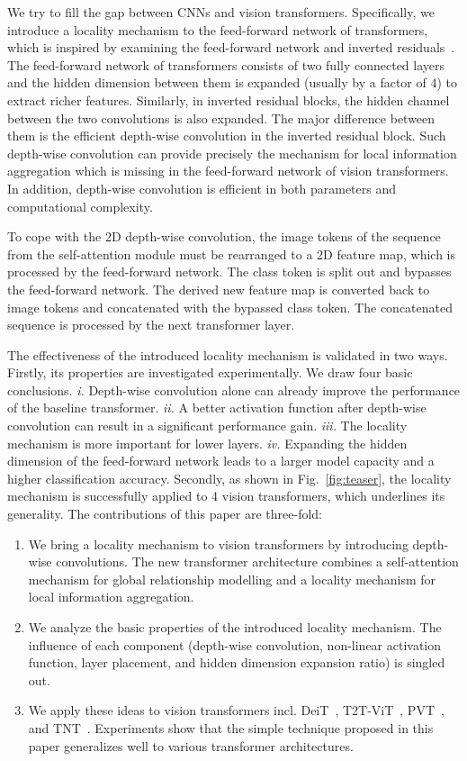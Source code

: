 \documentclass[10pt,twocolumn,letterpaper]{article}
\begin{document}
We try to fill the gap between CNNs and vision transformers. Specifically, we introduce a locality mechanism to the feed-forward network of transformers, which is inspired by examining the feed-forward network and inverted residuals~\cite{sandler2018mobilenetv2,howard2019searching}. The feed-forward network of transformers consists of two fully connected layers and the hidden dimension between them is expanded (usually by a factor of 4) to extract richer features. 
Similarly, in inverted residual blocks, the hidden channel between the two  convolutions is also expanded. The major difference between them is the efficient depth-wise convolution in the inverted residual block. 
Such depth-wise convolution can provide precisely the mechanism for local information aggregation which is missing in the feed-forward network of vision transformers.
In addition, depth-wise convolution is efficient in both parameters and computational complexity. 
 
To cope with the 2D depth-wise convolution, the image tokens of the sequence from the self-attention module must be rearranged to a 2D feature map, which is processed by the feed-forward network. The class token is split out and bypasses the feed-forward network. The derived new feature map is converted back to image tokens and concatenated with the bypassed class token. The concatenated sequence is processed by the next transformer layer. 

The effectiveness of the introduced locality mechanism is validated in two ways. Firstly, its properties are investigated experimentally. We draw four basic conclusions. \textit{i.} Depth-wise convolution alone can already improve the performance of the baseline transformer. \textit{ii.} A better activation function after depth-wise convolution can result in a significant performance gain. \textit{iii.} The locality mechanism is more important for lower layers. \textit{iv.} Expanding the hidden dimension of the feed-forward network leads to a larger model capacity and a higher classification accuracy. Secondly, as shown in Fig.~\ref{fig:teaser}, the locality mechanism is successfully applied to 4 vision transformers, which underlines its generality.  
The contributions of this paper are three-fold:
\begin{enumerate}
    \item We bring a locality mechanism to vision transformers by introducing depth-wise convolutions. The new transformer architecture combines a self-attention mechanism for global relationship modelling and a locality mechanism for local information aggregation.
    \item We analyze the basic properties of the introduced locality mechanism. The influence of each component (depth-wise convolution, non-linear activation function, layer placement, and hidden dimension expansion ratio) is singled out.
    \item We apply these ideas to vision transformers incl. DeiT~\cite{touvron2020training}, T2T-ViT~\cite{yuan2021tokens}, PVT~\cite{wang2021pyramid}, and TNT~\cite{han2021transformer}. Experiments show that the simple technique proposed in this paper generalizes well to various transformer architectures.
\end{enumerate}
\end{document}
